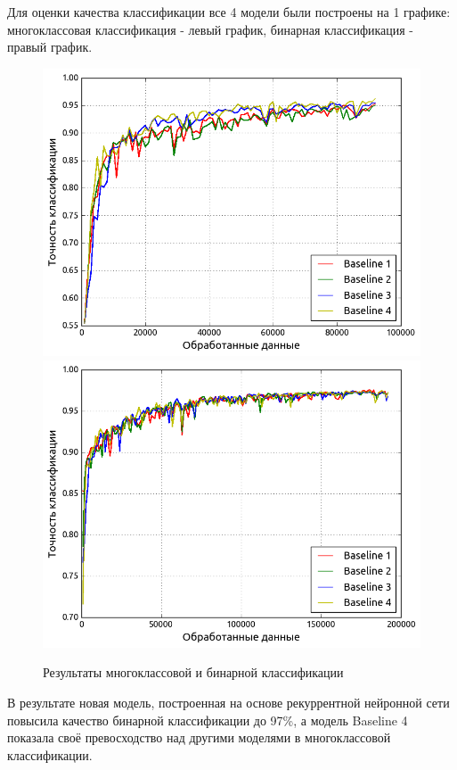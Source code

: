     Для оценки качества классификации все 4 модели были построены на 1 графике:
    многоклассовая классификация - левый график, бинарная классификация - правый график.
    \begin{figure}[H]
        \left
        \includegraphics[width=0.5\linewidth]{images/lstm_class/all.png}
        \right
        \includegraphics[width=0.5\linewidth]{images/lstm_class/2_class.png}
        \caption{Результаты многоклассовой и бинарной классификации}\label{length_entropy}
    \end{figure}
    В результате новая модель, построенная на основе рекуррентной нейронной сети повысила качество бинарной классификации до 97\%, а модель Baseline 4 показала своё превосходство над другими моделями в многоклассовой классификации.
\clearpage